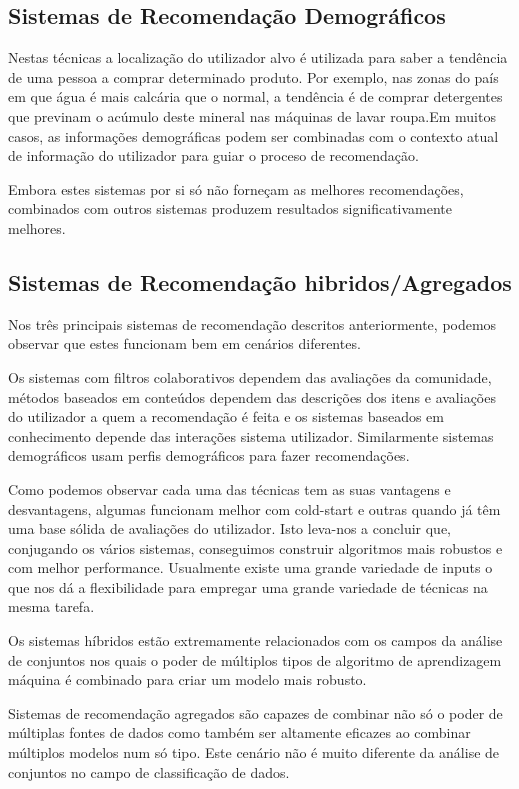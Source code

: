 \subsection{Sistemas de Recomendação Demográficos}\hfill
\par Nestas técnicas a localização do utilizador alvo é utilizada para saber a tendência de uma pessoa a comprar determinado produto. Por exemplo, nas zonas do país em que água é mais calcária que o normal, a tendência é de comprar detergentes que previnam o acúmulo deste mineral nas máquinas de lavar roupa.Em muitos casos, as informações demográficas podem ser combinadas com o contexto atual de informação do utilizador para guiar o proceso de recomendação.
\par Embora estes sistemas por si só não forneçam as melhores recomendações, combinados com outros sistemas produzem resultados significativamente melhores.
\hfill
\subsection{Sistemas de Recomendação hibridos/Agregados}
\hfill
 \par Nos três principais sistemas de recomendação descritos anteriormente, podemos observar que estes funcionam bem em cenários diferentes. 
 \par Os sistemas com filtros colaborativos dependem das avaliações da comunidade, métodos baseados em conteúdos dependem das descrições dos itens e avaliações do utilizador a quem a recomendação é feita e os sistemas baseados em conhecimento depende das interações sistema utilizador. Similarmente sistemas demográficos usam perfis demográficos para fazer recomendações.
 \par Como podemos observar cada uma das técnicas tem as suas vantagens e desvantagens, algumas funcionam melhor com cold-start e outras quando já têm uma base sólida de avaliações do utilizador. Isto leva-nos a concluir que, conjugando os vários sistemas, conseguimos construir algoritmos mais robustos e com melhor performance. Usualmente existe uma grande variedade de inputs o que nos dá a flexibilidade para empregar uma grande variedade de técnicas na mesma tarefa.
 \par Os sistemas híbridos estão extremamente relacionados com os campos da análise de conjuntos nos quais o poder de múltiplos tipos de algoritmo de aprendizagem máquina é combinado para criar um modelo mais robusto.
 \par Sistemas de recomendação agregados são capazes de combinar não só o poder de múltiplas fontes de dados como também ser altamente eficazes ao combinar múltiplos modelos num só tipo. Este cenário não é muito diferente da análise de conjuntos no campo de classificação de dados.

